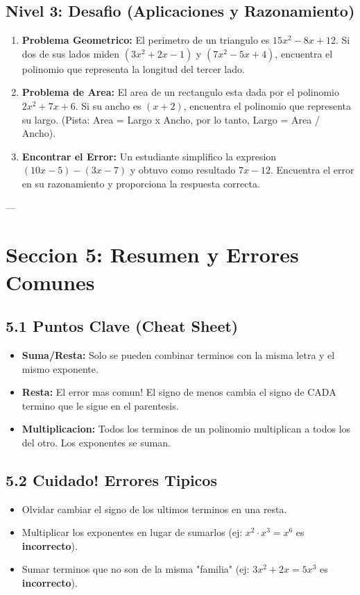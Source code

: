 \documentclass[12pt,a4paper]{article}
\begin{document}
\subsection*{Nivel 3: Desafio (Aplicaciones y Razonamiento)}\begin{enumerate}
    \item \textbf{Problema Geometrico:} El perimetro de un triangulo es $15x^2 - 8x + 12$. Si dos de sus lados miden $(3x^2 + 2x - 1)$ y $(7x^2 - 5x + 4)$, encuentra el polinomio que representa la longitud del tercer lado.
    \item \textbf{Problema de Area:} El area de un rectangulo esta dada por el polinomio $2x^2 + 7x + 6$. Si su ancho es $(x+2)$, encuentra el polinomio que representa su largo. (Pista: Area = Largo x Ancho, por lo tanto, Largo = Area / Ancho).
    \item \textbf{Encontrar el Error:} Un estudiante simplifico la expresion $(10x - 5) - (3x - 7)$ y obtuvo como resultado $7x - 12$. Encuentra el error en su razonamiento y proporciona la respuesta correcta.
\end{enumerate}

---

\section*{Seccion 5: Resumen y Errores Comunes}


\subsection*{5.1 Puntos Clave (Cheat Sheet)}
\begin{itemize}
    \item \textbf{Suma/Resta:} Solo se pueden combinar terminos con la misma letra y el mismo exponente.
    \item \textbf{Resta:} El error mas comun! El signo de menos cambia el signo de CADA termino que le sigue en el parentesis.
    \item \textbf{Multiplicacion:} Todos los terminos de un polinomio multiplican a todos los del otro. Los exponentes se suman.
\end{itemize}

\subsection*{5.2 Cuidado! Errores Tipicos}
\begin{itemize}
    \item Olvidar cambiar el signo de los ultimos terminos en una resta.
    \item Multiplicar los exponentes en lugar de sumarlos (ej: $x^2 \cdot x^3 = x^6$ es \textbf{incorrecto}).
    \item Sumar terminos que no son de la misma "familia" (ej: $3x^2 + 2x = 5x^3$ es \textbf{incorrecto}).
\end{itemize}
\end{document}
